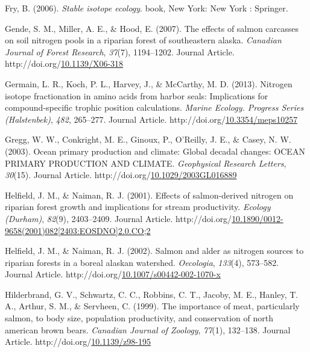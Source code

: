 \documentclass [11pt, proquest] {uwthesis}[2015/03/03]
\newlength{\cslhangindent}
\newenvironment{CSLReferences}%
{\setlength{\parindent}{0pt}%
\everypar{\setlength{\hangindent}{\cslhangindent}}\ignorespaces}%
{\par}
\begin{document}
\begin{CSLReferences}{1}{0}
\leavevmode\hypertarget{ref-Fry2006}{}%
Fry, B. (2006). \emph{Stable isotope ecology}. book, New York: New York : Springer.

\leavevmode\hypertarget{ref-Gende2007}{}%
Gende, S. M., Miller, A. E., \& Hood, E. (2007). The effects of salmon carcasses on soil nitrogen pools in a riparian forest of southeastern alaska. \emph{Canadian Journal of Forest Research}, \emph{37}(7), 1194--1202. Journal Article. http://doi.org/\href{https://doi.org/10.1139/X06-318}{10.1139/X06-318}

\leavevmode\hypertarget{ref-Germain2013}{}%
Germain, L. R., Koch, P. L., Harvey, J., \& McCarthy, M. D. (2013). Nitrogen isotope fractionation in amino acids from harbor seals: Implications for compound-specific trophic position calculations. \emph{Marine Ecology. Progress Series (Halstenbek)}, \emph{482}, 265--277. Journal Article. http://doi.org/\href{https://doi.org/10.3354/meps10257}{10.3354/meps10257}

\leavevmode\hypertarget{ref-Gregg2003}{}%
Gregg, W. W., Conkright, M. E., Ginoux, P., O'Reilly, J. E., \& Casey, N. W. (2003). Ocean primary production and climate: Global decadal changes: OCEAN PRIMARY PRODUCTION AND CLIMATE. \emph{Geophysical Research Letters}, \emph{30}(15). Journal Article. http://doi.org/\href{https://doi.org/10.1029/2003GL016889}{10.1029/2003GL016889}

\leavevmode\hypertarget{ref-Helfield2001}{}%
Helfield, J. M., \& Naiman, R. J. (2001). Effects of salmon-derived nitrogen on riparian forest growth and implications for stream productivity. \emph{Ecology (Durham)}, \emph{82}(9), 2403--2409. Journal Article. http://doi.org/\href{https://doi.org/10.1890/0012-9658(2001)082\%5B2403:EOSDNO\%5D2.0.CO;2}{10.1890/0012-9658(2001)082{[}2403:EOSDNO{]}2.0.CO;2}

\leavevmode\hypertarget{ref-Helfield2002}{}%
Helfield, J. M., \& Naiman, R. J. (2002). Salmon and alder as nitrogen sources to riparian forests in a boreal alaskan watershed. \emph{Oecologia}, \emph{133}(4), 573--582. Journal Article. http://doi.org/\href{https://doi.org/10.1007/s00442-002-1070-x}{10.1007/s00442-002-1070-x}

\leavevmode\hypertarget{ref-Hilderbrand1999}{}%
Hilderbrand, G. V., Schwartz, C. C., Robbins, C. T., Jacoby, M. E., Hanley, T. A., Arthur, S. M., \& Servheen, C. (1999). The importance of meat, particularly salmon, to body size, population productivity, and conservation of north american brown bears. \emph{Canadian Journal of Zoology}, \emph{77}(1), 132--138. Journal Article. http://doi.org/\href{https://doi.org/10.1139/z98-195}{10.1139/z98-195}


\end{CSLReferences}
\end{document}
